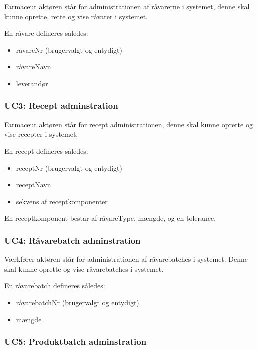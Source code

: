 \documentclass[a4paper]{article}
\begin{document}
Farmaceut aktøren står for administrationen af råvarerne i systemet, denne skal kunne oprette, rette og vise råvarer i systemet.

En råvare defineres således:

\begin{itemize}
  \item råvareNr (brugervalgt og entydigt)
  \item råvareNavn
  \item leverandør
\end{itemize}


\subsubsection{UC3: Recept adminstration} %

Farmaceut aktøren står for recept administrationen, denne skal kunne oprette og vise recepter i systemet.

En recept defineres således:
\begin{itemize}
  \item receptNr (brugervalgt og entydigt)
  \item receptNavn
  \item sekvens af receptkomponenter
\end{itemize}

En receptkomponent består af råvareType, mængde, og en tolerance.


\subsubsection{UC4: Råvarebatch adminstration} %

Værkfører aktøren står for administrationen af råvarebatches i systemet. Denne skal kunne oprette og vise råvarebatches i systemet. 

En råvarebatch defineres således:

\begin{itemize}
  \item råvarebatchNr (brugervalgt og entydigt)
  \item mængde
\end{itemize}


\subsubsection{UC5: Produktbatch adminstration} %
\end{document}
